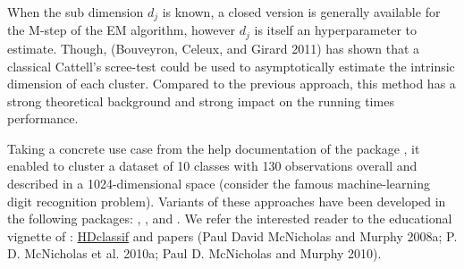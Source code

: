 When the sub dimension \(d_j\) is known, a closed version is generally available for the M-step of the EM algorithm, however \(d_j\) is itself an hyperparameter to estimate. Though, (Bouveyron, Celeux, and Girard 2011) has shown that a classical Cattell's scree-test could be used to asymptotically estimate the intrinsic dimension of each cluster. Compared to the previous approach, this method has a strong theoretical background and strong impact on the running times performance.

Taking a concrete use case from the help documentation of the package , it enabled to cluster a dataset of 10 classes with 130 observations overall and described in a 1024-dimensional space (consider the famous machine-learning digit recognition problem). Variants of these approaches have been developed in the following packages: , ,  and . We refer the interested reader to the educational vignette of : \href{https://rdrr.io/pkg/HDclassif/man/HDclassif-package.html}{HDclassif} and papers (Paul David McNicholas and Murphy 2008a; P. D. McNicholas et al. 2010a; Paul D. McNicholas and Murphy 2010).

\color{blue}

